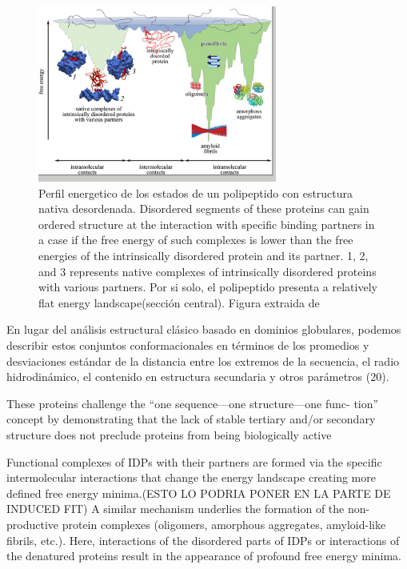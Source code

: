 \begin{figure}[htbp]
\centering
\includegraphics[width=0.7\textwidth]{img/idpEnLandscape.png} 
\caption{Perfil energetico de los estados de un polipeptido con estructura nativa desordenada. 
Disordered segments of these proteins can gain ordered structure at the interaction with specific binding partners in a case if the free energy of such complexes is lower 
than the free energies of the intrinsically disordered protein and its partner. 
1, 2, and 3 represents native complexes of intrinsically disordered proteins with various partners.
Por si solo, el polipeptido presenta a relatively flat energy landscape(sección central). Figura extraida de \cite{turoverov2010protein}}
\label{idpenergyLandscape}
\end{figure}

En lugar del análisis estructural clásico basado en dominios globulares, podemos describir estos conjuntos conformacionales en términos de los promedios y desviaciones estándar de la distancia entre los extremos de la secuencia, el radio hidrodinámico, el contenido en estructura secundaria y otros parámetros (20).

These proteins challenge the
“one sequence—one structure—one func-
tion” concept by demonstrating that the
lack of stable tertiary and/or secondary
structure does not preclude proteins
from being biologically active

Functional complexes of IDPs with their partners are formed via the specific intermolecular interactions that change the energy landscape creating more defined free energy minima.(ESTO LO PODRIA PONER EN LA PARTE DE INDUCED FIT)
A similar mechanism underlies the formation of the non-productive protein complexes (oligomers, amorphous aggregates, amyloid-like fibrils, etc.). Here, interactions of the disordered parts of IDPs or interactions of the denatured proteins result in the appearance of profound free energy minima.





